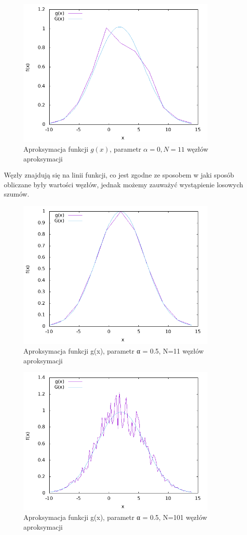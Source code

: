 \documentclass{article}
\begin{document}
\begin{figure}[H]
\centering
\includegraphics[width=10cm]{zaburzen.png}
\caption{Aproksymacja funkcji $g(x)$, parametr $\alpha=0, N=11$ węzłów aproksymacji}
\label{fig:obrazek zaburzen}
\end{figure}
Węzły znajdują się na linii funkcji, co jest zgodne ze sposobem w jaki sposób obliczane były wartości węzłów, jednak możemy zauważyć wystąpienie losowych szumów.
\begin{figure}[H]
\centering
\includegraphics[width=10cm]{bez_zaburzen.png}
\caption{Aproksymacja funkcji g(x), parametr α = 0.5, N=11 węzłów aproksymacji}
\label{fig:obrazek bez_zaburzen}
\end{figure}

\begin{figure}[H]
\centering
\includegraphics[width=10cm]{101.png}
\caption{Aproksymacja funkcji g(x), parametr α = 0.5, N=101 węzłów aproksymacji}
\label{fig:obrazek 101}
\end{figure}
\end{document}
